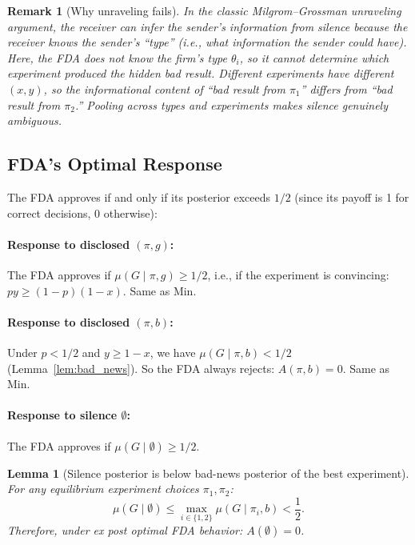 \documentclass[12pt,a4paper]{article}
\newtheorem{lemma}{Lemma}
\newtheorem{remark}{Remark}
\begin{document}
\begin{remark}[Why unraveling fails]\label{rem:no_unravel}
In the classic Milgrom--Grossman unraveling argument, the
receiver can infer the sender's information from silence
because the receiver knows the sender's ``type'' (i.e., what
information the sender could have). Here, the FDA does not know
the firm's type $\theta_i$, so it cannot determine which
experiment produced the hidden bad result. Different experiments
have different $(x, y)$, so the informational content of ``bad
result from $\pi_1$'' differs from ``bad result from $\pi_2$.''
Pooling across types and experiments makes silence genuinely
ambiguous.
\end{remark}


\subsection{FDA's Optimal Response}
\label{sec:fda_response}

The FDA approves if and only if its posterior exceeds $1/2$
(since its payoff is 1 for correct decisions, 0 otherwise):

\paragraph{Response to disclosed $(\pi, g)$:}
The FDA approves if $\mu(G \mid \pi, g) \geq 1/2$, i.e., if
the experiment is convincing:\ $py \geq (1-p)(1-x)$.
Same as Min.

\paragraph{Response to disclosed $(\pi, b)$:}
Under $p < 1/2$ and $y \geq 1 - x$, we have
$\mu(G \mid \pi, b) < 1/2$ (Lemma~\ref{lem:bad_news}). So the
FDA always rejects: $A(\pi, b) = 0$. Same as Min.

\paragraph{Response to silence $\emptyset$:}
The FDA approves if
$\mu(G \mid \emptyset) \geq 1/2$.

\begin{lemma}[Silence posterior is below bad-news posterior
  of the best experiment]\label{lem:silence_bound}
For any equilibrium experiment choices $\pi_1, \pi_2$:
\[
  \mu(G \mid \emptyset)
  \leq \max_{i \in \{1,2\}} \mu(G \mid \pi_i, b)
  < \frac{1}{2}.
\]
Therefore, under ex post optimal FDA behavior:
$A(\emptyset) = 0$.
\end{lemma}
\end{document}
